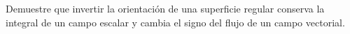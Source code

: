 Demuestre que invertir la orientación de una superficie regular conserva la integral de un campo escalar y cambia el signo del flujo de un campo vectorial.
